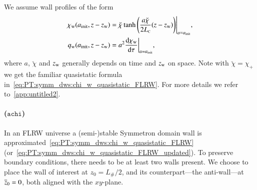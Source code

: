     We assume wall profiles of the form
    \begin{subequations}
        \begin{align}
            \chi_\mathrm{w}(a_\mathrm{init}, z- z_\mathrm{w}) &= {\breve{\chi}\tanh{{\left( \frac{a\breve{\chi}}{2L_{\text{\tiny{C}}}} (z-z\ensuremath{_\mathrm{w}})  \right)}} }\Bigg|_{a=a_\mathrm{init}}, \\
            q_\mathrm{w}(a_\mathrm{init}, z- z_\mathrm{w}) &= a^2 \dv{\chi\ensuremath{_\mathrm{w}}}{\tau}\bigg|_{a=a_\mathrm{init}},
        \end{align}
    \end{subequations}
    where $a$, $\breve{\chi}$ and $z_\mathrm{w}$ generally depends on time and $z_\mathrm{w}$ on space. Note with $\breve{\chi}=\chi_+$ we get the familiar quasistatic formula in~\cref{eq:PT:symm_dws:chi_w_quasistatic_FLRW}. For more details we refer to~\cref{app:untitled2}.

    \paragraph{($\mathtt{achi}$)} %
    In an FLRW universe a (semi-)stable Symmetron domain wall is approximated~\cref{eq:PT:symm_dws:chi_w_quasistatic_FLRW} (or~\cref{eq:PT:symm_dws:chi_w_quasistatic_FLRW_updated}). To preserve boundary conditions, there needs to be at least two walls present. We choose to place the wall of interest at $z_0 = L_\#/2$, and its counterpart---the anti-wall---at $\overline{z}_0=0$, both aligned with the $xy$-plane. %
    

